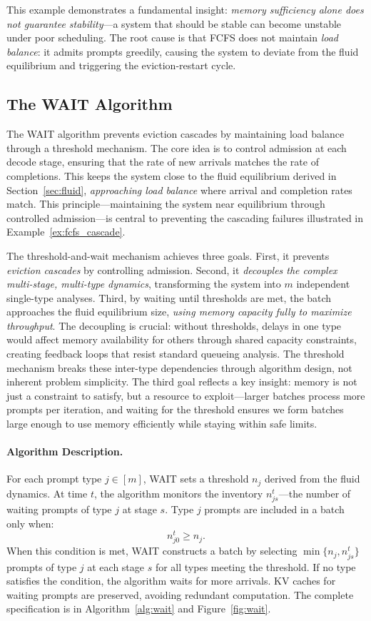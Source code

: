 This example demonstrates a fundamental insight: \emph{memory sufficiency alone does not guarantee stability}---a system that should be stable can become unstable under poor scheduling. The root cause is that FCFS does not maintain \emph{load balance}: it admits prompts greedily, causing the system to deviate from the fluid equilibrium and triggering the eviction-restart cycle.

\subsection{The WAIT Algorithm}
\label{subsec:wait_algorithm}

The WAIT algorithm prevents eviction cascades by maintaining load balance through a threshold mechanism. The core idea is to control admission at each decode stage, ensuring that the rate of new arrivals matches the rate of completions. This keeps the system close to the fluid equilibrium derived in Section~\ref{sec:fluid}, \emph{approaching load balance} where arrival and completion rates match. This principle---maintaining the system near equilibrium through controlled admission---is central to preventing the cascading failures illustrated in Example~\ref{ex:fcfs_cascade}.

The threshold-and-wait mechanism achieves three goals. First, it prevents \emph{eviction cascades} by controlling admission. Second, it \emph{decouples the complex multi-stage, multi-type dynamics}, transforming the system into $m$ independent single-type analyses. Third, by waiting until thresholds are met, the batch approaches the fluid equilibrium size, \emph{using memory capacity fully to maximize throughput}. The decoupling is crucial: without thresholds, delays in one type would affect memory availability for others through shared capacity constraints, creating feedback loops that resist standard queueing analysis. The threshold mechanism breaks these inter-type dependencies through algorithm design, not inherent problem simplicity. The third goal reflects a key insight: memory is not just a constraint to satisfy, but a resource to exploit---larger batches process more prompts per iteration, and waiting for the threshold ensures we form batches large enough to use memory efficiently while staying within safe limits.

\paragraph{Algorithm Description.} For each prompt type $j \in [m]$, WAIT sets a threshold $n_j$ derived from the fluid dynamics. At time $t$, the algorithm monitors the inventory $n_{js}^t$---the number of waiting prompts of type $j$ at stage $s$. Type $j$ prompts are included in a batch only when:
\[
n_{j0}^t \geq n_j.
\]
When this condition is met, WAIT constructs a batch by selecting $\min\{n_j, n_{js}^t\}$ prompts of type $j$ at each stage $s$ for all types meeting the threshold. If no type satisfies the condition, the algorithm waits for more arrivals. KV caches for waiting prompts are preserved, avoiding redundant computation. The complete specification is in Algorithm~\ref{alg:wait} and Figure~\ref{fig:wait}.

